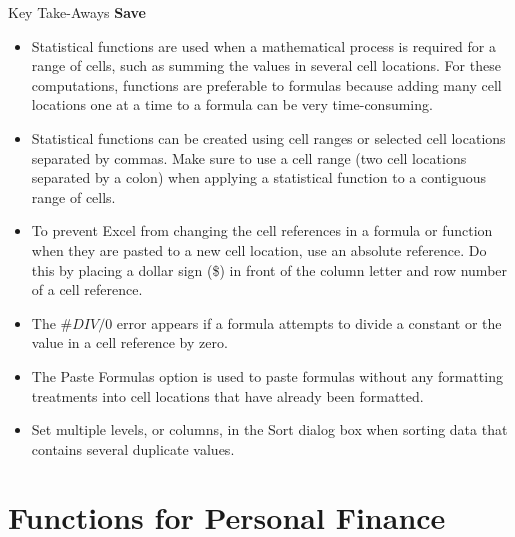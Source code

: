 \begin{center}
	\begin{tkwbox}{Key Take-Aways}
		\textbf{Save}
		\\
		\begin{itemize}
			\setlength{\itemsep}{0pt}
			\setlength{\parskip}{0pt}
			\setlength{\parsep}{0pt}
			
			\item Statistical functions are used when a mathematical process is required for a range of cells, such as summing the values in several cell locations. For these computations, functions are preferable to formulas because adding many cell locations one at a time to a formula can be very time-consuming.
			\item Statistical functions can be created using cell ranges or selected cell locations separated by commas. Make sure to use a cell range (two cell locations separated by a colon) when applying a statistical function to a contiguous range of cells.
			\item To prevent Excel from changing the cell references in a formula or function when they are pasted to a new cell location, use an absolute reference. Do this by placing a dollar sign (\$) in front of the column letter and row number of a cell reference.
			\item The $ \#DIV/0 $ error appears if a formula attempts to divide a constant or the value in a cell reference by zero.
			\item The Paste Formulas option is used to paste formulas without any formatting treatments into cell locations that have already been formatted.
			\item Set multiple levels, or columns, in the Sort dialog box when sorting data that contains several duplicate values.
			
		\end{itemize}
	\end{tkwbox}
\end{center}

\section{Functions for Personal Finance}\label{ch02:functions_personal}

